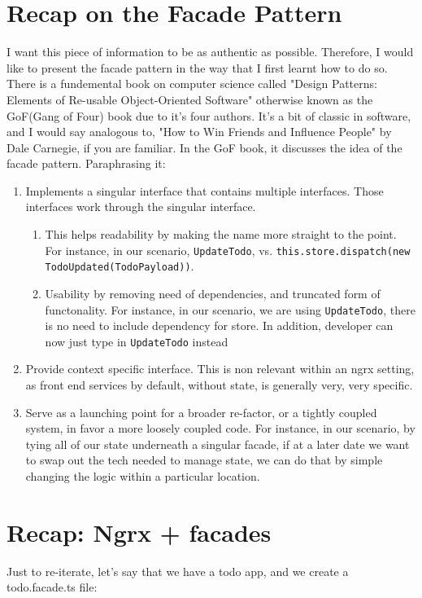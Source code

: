 \section{Recap on the Facade Pattern}
I want this piece of information to be as authentic as possible. Therefore, I would like to present the facade pattern in the way that I first learnt how to do so. There is a fundemental book on computer science called "Design Patterns: Elements of Re-usable Object-Oriented Software" otherwise known as the GoF(Gang of Four) book due to it's four authors. It's a bit of classic in software, and I would say analogous to, "How to Win Friends and Influence People" by Dale Carnegie, if you are familiar. In the GoF book, it discusses the idea of the facade pattern. Paraphrasing it: 
\begin{enumerate}
  \item Implements a singular interface that contains multiple interfaces. Those interfaces work through the singular interface.
  \begin{enumerate}
    \item This helps readability by making the name more straight to the point. For instance, in our scenario, \lstinline{UpdateTodo}, vs. \lstinline{this.store.dispatch(new TodoUpdated(TodoPayload))}. 
    \item Usability by removing need of dependencies, and truncated form of functonality. For instance, in our scenario, we are using \lstinline{UpdateTodo}, there is no need to include dependency for store. In addition, developer can now just type in \lstinline{UpdateTodo} instead 
  \end{enumerate}
  \item Provide context specific interface. This is non relevant within an ngrx setting, as front end services by default, without state, is generally very, very specific.
  \item Serve as a launching point for a broader re-factor, or a tightly coupled system, in favor a more loosely coupled code. For instance, in our scenario, by tying all of our state underneath a singular facade, if at a later date we want to swap out the tech needed to manage state, we can do that by simple changing the logic within a particular location. 
\end{enumerate}

\section{Recap: Ngrx + facades}
Just to re-iterate, let's say that we have a todo app, and we create a todo.facade.ts file:

